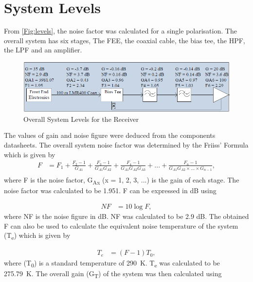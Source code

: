 \documentclass[12pt,a4paper]{report}
\begin{document}
\newpage	
\section{System Levels}

From \autoref{Fig:levels}, the noise factor was calculated for a single polarisation. The overall system has six stages, The FEE, the coaxial cable, the bias tee, the HPF, the LPF and an amplifier. 
\begin{figure}[h!]
	\begin{center}
 		\includegraphics[width=1\linewidth]{Figures/levels.PNG}
		\caption{Overall System Levels for the Receiver}
		\label{Fig:levels}
	\end{center}
\end{figure}

The values of gain and noise figure were deduced from the components datasheets. The overall system noise factor was determined by the Friiss' Formula which is given by
\begin{equation} \label{eq2.2}
	\begin{split}
	F & = F_{1} + \frac{F_{2} - 1}{G_{A1}} + \frac{F_{3} - 1}{G_{A1} G_{A2}} + \frac{F_{4} - 1}{G_{A1} G_{A2} G_{A3}} +... + \frac{F_{n} - 1}{G_{A1} G_{A2} \times ... \times G_{n-1}}, \\[0.1cm]				
	\end{split}
\end{equation}
where F is the noise factor, G\textsubscript{Ax} (x = 1, 2, 3, ...) is the gain of each stage. The noise factor was calculated to be 1.951. F can be expressed in dB using 
		
\begin{equation} \label{eq2.3}
	\begin{split}
	NF & = 10 \log F,				
	\end{split}
\end{equation}
where NF is the noise figure in dB. NF was calculated to be 2.9 dB. The obtained F can also be used to calculate the equivalent noise temperature of the system (T\textsubscript{e}) which is given by 

\begin{equation} \label{eq2.9}
\begin{split}
T_{e} & = (F-1)T_{0},				
\end{split}
\end{equation}
where (T\textsubscript{0}) is a standard temperature of \SI{290}{\kelvin}. T\textsubscript{e} was calculated to be \SI{275.79}{\kelvin}. The overall gain (G\textsubscript{T}) of the system was then calculated using 
	
\end{document}
